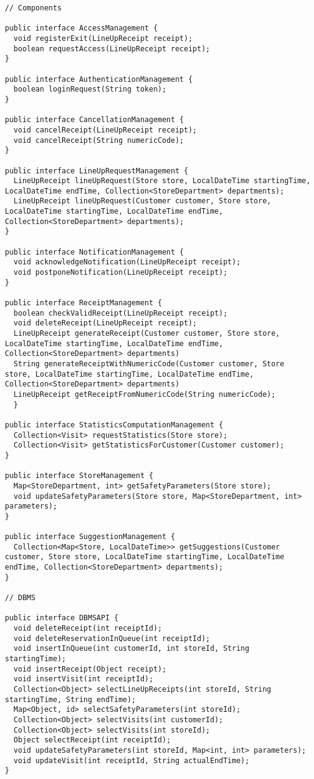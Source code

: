 \documentclass[../../main.tex]{subfiles}
\begin{document}
\begin{lstlisting}
// Components

public interface AccessManagement {
  void registerExit(LineUpReceipt receipt);
  boolean requestAccess(LineUpReceipt receipt);
}

public interface AuthenticationManagement {
  boolean loginRequest(String token);
}

public interface CancellationManagement {
  void cancelReceipt(LineUpReceipt receipt);
  void cancelReceipt(String numericCode);
}

public interface LineUpRequestManagement {
  LineUpReceipt lineUpRequest(Store store, LocalDateTime startingTime, LocalDateTime endTime, Collection<StoreDepartment> departments);
  LineUpReceipt lineUpRequest(Customer customer, Store store, LocalDateTime startingTime, LocalDateTime endTime, Collection<StoreDepartment> departments);
}

public interface NotificationManagement {
  void acknowledgeNotification(LineUpReceipt receipt);
  void postponeNotification(LineUpReceipt receipt);
}

public interface ReceiptManagement {
  boolean checkValidReceipt(LineUpReceipt receipt);
  void deleteReceipt(LineUpReceipt receipt);
  LineUpReceipt generateReceipt(Customer customer, Store store, LocalDateTime startingTime, LocalDateTime endTime, Collection<StoreDepartment> departments)
  String generateReceiptWithNumericCode(Customer customer, Store store, LocalDateTime startingTime, LocalDateTime endTime, Collection<StoreDepartment> departments)
  LineUpReceipt getReceiptFromNumericCode(String numericCode);
  }

public interface StatisticsComputationManagement {
  Collection<Visit> requestStatistics(Store store);
  Collection<Visit> getStatisticsForCustomer(Customer customer);
}

public interface StoreManagement {
  Map<StoreDepartment, int> getSafetyParameters(Store store);
  void updateSafetyParameters(Store store, Map<StoreDepartment, int> parameters);
}

public interface SuggestionManagement {
  Collection<Map<Store, LocalDateTime>> getSuggestions(Customer customer, Store store, LocalDateTime startingTime, LocalDateTime endTime, Collection<StoreDepartment> departments);
}

// DBMS

public interface DBMSAPI {
  void deleteReceipt(int receiptId);
  void deleteReservationInQueue(int receiptId);
  void insertInQueue(int customerId, int storeId, String startingTime);
  void insertReceipt(Object receipt);
  void insertVisit(int receiptId);
  Collection<Object> selectLineUpReceipts(int storeId, String startingTime, String endTime);
  Map<Object, id> selectSafetyParameters(int storeId);
  Collection<Object> selectVisits(int customerId);
  Collection<Object> selectVisits(int storeId);
  Object selectReceipt(int receiptId);
  void updateSafetyParameters(int storeId, Map<int, int> parameters);
  void updateVisit(int receiptId, String actualEndTime);
}


\end{lstlisting}
\end{document}
